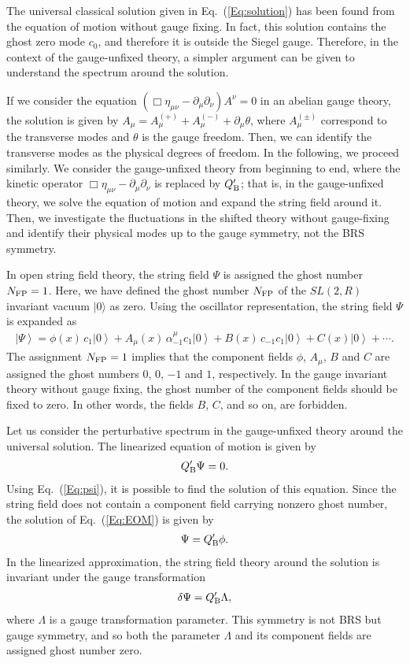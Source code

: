 \documentclass[a4paper,seceq,preprint]{ptptex}
\newcommand{\ket}[1]{\left| #1 \right>}
\newcommand{\Q}{Q_{\rm B}}
\begin{document}
The universal classical solution given in  Eq.~(\ref{Eq:solution}) has been
found from the equation of motion without gauge fixing. In fact, this
solution contains the ghost zero mode $c_0$, and therefore it is outside the
Siegel gauge. 
Therefore, 
in the context of the gauge-unfixed theory, 
a simpler argument can be given to understand the spectrum
around the solution. 

If we consider the equation
$(\Box\eta_{\mu\nu}-\partial_\mu \partial_\nu) A^\nu=0$
in an abelian
gauge theory, the solution is given 
by $A_\mu=A_\mu^{(+)}+A_\mu^{(-)}+\partial_\mu \theta$, 
where  $A_\mu^{(\pm)}$ correspond to the transverse modes 
and $\theta$ is the gauge freedom. Then, we can identify the transverse
modes as the physical degrees of freedom.
In the following, we proceed similarly. We consider the gauge-unfixed 
theory from beginning to end, where the kinetic 
operator $\Box\eta_{\mu\nu} -\partial_\mu \partial_\nu$ is 
replaced by $\Q'$; that is, 
in the gauge-unfixed theory, we
solve the equation of motion and expand the string field around
it. Then, we investigate the fluctuations in the shifted theory
without gauge-fixing and identify their physical modes up to
the gauge symmetry, not the BRS symmetry.

In open string field theory, the string field $\Psi$ is assigned the
ghost number $N_{\rm FP}=1$.\cite{rf:CSFT,rf:HIKKO}
Here, we have defined the ghost number $N_{\rm FP}$ of the $SL(2,R)$
invariant vacuum $|0\rangle$ as zero.  
Using the oscillator
representation, the string field $\Psi$ is expanded as
\begin{eqnarray}
 \ket{\Psi} = \phi(x)\,c_1\ket{0}+ A_\mu(x)\,\alpha_{-1}^\mu c_1\ket{0}
  +B(x)\,c_{-1}c_1\ket{0} + C(x) \ket{0}+\cdots.
\end{eqnarray}
The assignment $N_{\rm FP}=1$ implies that the component 
fields $\phi$, $A_\mu$, $B$ and $C$ are assigned the ghost numbers $0$, $0$,
$-1$ and $1$, respectively. In the gauge invariant theory without gauge
fixing, the ghost number of the component fields should be 
fixed to zero. In other words, the fields $B$, $C$, and so on, are forbidden.

Let us consider the perturbative spectrum in the gauge-unfixed theory
around the 
universal solution. The linearized equation 
of motion is given by
\begin{eqnarray}
\label{Eq:EOM}
 \Q'\Psi=0.
\end{eqnarray}
Using Eq.~(\ref{Eq:psi}), it is possible to find the solution of this
equation. Since the string field does not contain a component field
carrying nonzero ghost number, the solution of Eq.~(\ref{Eq:EOM}) is
given by
\begin{eqnarray}
\label{Eq:psolution}
 \Psi=\Q'\phi.
\end{eqnarray}
In the linearized approximation, the string field theory around the
solution is invariant under the gauge transformation
\begin{eqnarray}
\label{Eq:pgauge}
 \delta \Psi = \Q' \Lambda,
\end{eqnarray}
where $\Lambda$ is a gauge transformation parameter.
This symmetry is not BRS but gauge symmetry, and so both 
the parameter $\Lambda$ and its
component fields are assigned ghost number zero. 
\end{document}
